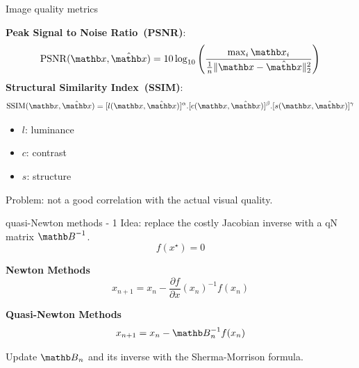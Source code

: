 \begin{frame}{Image quality metrics}
    \begin{multicols}{2}
        \textbf{Peak Signal to Noise Ratio~(PSNR)}:
        \begin{equation*}
            \operatorname{PSNR}(\xb, \hat{\xb}) = 10 \log_{10}\left( \frac{\max_i{\xb_i}}{\frac1n \|\xb - \hat{\xb}\|^2_2}\right)
        \end{equation*}
        \newpage
        \textbf{Structural Similarity Index~(SSIM)}:
        \begin{equation*}
            \operatorname{SSIM}(\xb, \hat{\xb}) = [l(\xb, \hat{\xb})]^\alpha . [c(\xb, \hat{\xb})]^\beta . [s(\xb, \hat{\xb})]^\gamma
        \end{equation*}
        \begin{itemize}
            \item $l$: luminance
            \item $c$: contrast
            \item $s$: structure
        \end{itemize}
    \end{multicols}
    Problem: not a good correlation with the actual visual quality.
\end{frame}

\begin{frame}{quasi-Newton methods - 1}
    Idea: replace the costly Jacobian inverse with a qN matrix $\Bb^{-1}$.\\
    \begin{equation*}
        f(x^\star) = 0
    \end{equation*}
    \begin{multicols}{2}

            \begin{center}
                \textbf{Newton Methods}
                \begin{equation*}
                    x_{n+1} = x_n -\frac{\partial f}{\partial x}(x_n)^{-1}f(x_n)
                \end{equation*}
            \end{center}
            \newpage
            \begin{center}
                \textbf{Quasi-Newton Methods}
                \begin{equation*}
                    x_{n+1} = x_n -\Bb_n^{-1}f(x_n)
                \end{equation*}
            \end{center}
            Update $\Bb_n$ and its inverse with the Sherma-Morrison formula.
    \end{multicols}
\end{frame}

